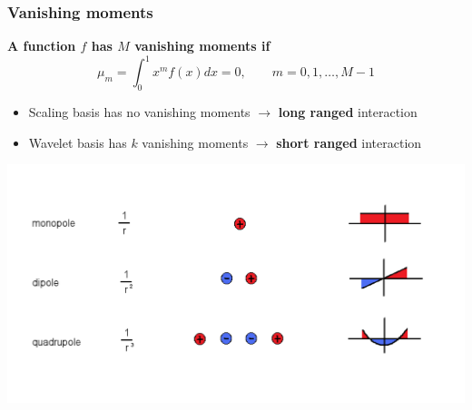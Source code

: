 \begin{frame}
\begin{columns}
\begin{column}[b]{0.4\linewidth}
\begin{center}
{        \vspace{15mm}
    }
    \end{center}
    \end{column}
    \end{columns}
\end{frame}

\begin{frame}
    \frametitle{Vanishing moments}
    \scriptsize
    \centering
    \textbf{A function $f$ has $M$ vanishing moments if}
    \begin{equation}
        \nonumber
        \mu_m = \int_0^1 x^m f(x) dx = 0,\qquad m = 0, 1, \dots, M - 1
    \end{equation}
    \vspace{2mm}
    \begin{itemize}
        \item   Scaling basis has no vanishing moments $\longrightarrow$ 
		\textbf{long ranged} interaction
        \item   Wavelet basis has $k$ vanishing moments $\longrightarrow$ 
		\textbf{short ranged} interaction
    \end{itemize}
    \vspace{2mm}
    \includegraphics[scale=0.4, clip, viewport = 0 50 680 350]{figures/multipoles.pdf}
\end{frame}


